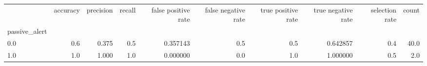 \begin{tabular}{lrrrrrrrrr}
\toprule
{} &  accuracy &  precision &  recall &  false positive rate &  false negative rate &  true positive rate &  true negative rate &  selection rate &  count \\
passive\_alert &           &            &         &                      &                      &                     &                     &                 &        \\
\midrule
0.0           &       0.6 &      0.375 &     0.5 &             0.357143 &                  0.5 &                 0.5 &            0.642857 &             0.4 &   40.0 \\
1.0           &       1.0 &      1.000 &     1.0 &             0.000000 &                  0.0 &                 1.0 &            1.000000 &             0.5 &    2.0 \\
\bottomrule
\end{tabular}
